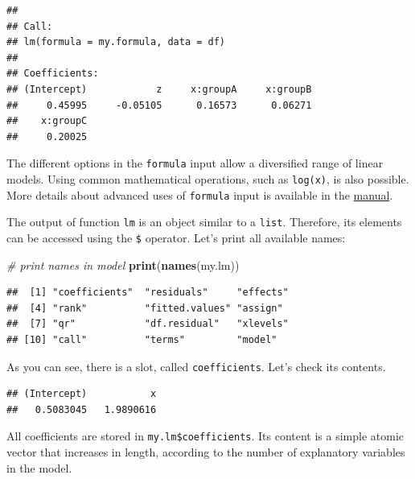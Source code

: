 \documentclass[11pt,]{book}
\newenvironment{Shaded}{\begin{snugshade}}{\end{snugshade}}
\newcommand{\KeywordTok}[1]{\textcolor[rgb]{0.27,0.27,0.27}{\textbf{#1}}}
\newcommand{\CommentTok}[1]{\textcolor[rgb]{0.56,0.35,0.01}{\textit{#1}}}
\newcommand{\OperatorTok}[1]{\textcolor[rgb]{0.81,0.36,0.00}{\textbf{#1}}}
\newcommand{\NormalTok}[1]{#1}
\begin{document}
\begin{verbatim}
## 
## Call:
## lm(formula = my.formula, data = df)
## 
## Coefficients:
## (Intercept)            z     x:groupA     x:groupB  
##     0.45995     -0.05105      0.16573      0.06271  
##    x:groupC  
##     0.20025
\end{verbatim}

The different options in the \texttt{formula} input allow a diversified
range of linear models. Using common mathematical operations, such as
\texttt{log(x)}, is also possible. More details about advanced uses of
\texttt{formula} input is available in the
\href{https://stat.ethz.ch/R-manual/R-devel/library/stats/html/formula.html}{manual}.

The output of function \texttt{lm} is an object similar to a
\texttt{list}. Therefore, its elements can be accessed using the
\texttt{\$} operator. Let's print all available names:

\begin{Shaded}
\begin{Highlighting}[]
\CommentTok{# print names in model}
\KeywordTok{print}\NormalTok{(}\KeywordTok{names}\NormalTok{(my.lm))}
\end{Highlighting}
\end{Shaded}

\begin{verbatim}
##  [1] "coefficients"  "residuals"     "effects"      
##  [4] "rank"          "fitted.values" "assign"       
##  [7] "qr"            "df.residual"   "xlevels"      
## [10] "call"          "terms"         "model"
\end{verbatim}

As you can see, there is a slot, called \texttt{coefficients}. Let's
check its contents.

\begin{Shaded}
\end{Shaded}

\begin{verbatim}
## (Intercept)           x 
##   0.5083045   1.9890616
\end{verbatim}

All coefficients are stored in \texttt{my.lm\$coefficients}. Its content
is a simple atomic vector that increases in length, according to the
number of explanatory variables in the model.
\end{document}
